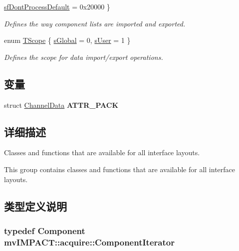 \begin{DoxyCompactItemize}
$$\hyperlink{group___common_interface_gga9390ccf3b2ebe68eee998798d59dc823a05618930605f5d0981bdfe164706004d}{sf\+Dont\+Process\+Default} = 0x20000
 \}
\begin{DoxyCompactList}\small\item\em Defines the way component lists are imported and exported. \end{DoxyCompactList}\item 
enum \hyperlink{group___common_interface_gae6cc8fec0123f239690564ecdeba4350}{T\+Scope} \{ \hyperlink{group___common_interface_ggae6cc8fec0123f239690564ecdeba4350a54b8661877c9fef76d20cc2b83722c60}{s\+Global} = 0, 
\hyperlink{group___common_interface_ggae6cc8fec0123f239690564ecdeba4350a333304553cd48305e063dcda379bde79}{s\+User} = 1
 \}
\begin{DoxyCompactList}\small\item\em Defines the scope for data import/export operations. \end{DoxyCompactList}\end{DoxyCompactItemize}
\subsection*{变量}
\begin{DoxyCompactItemize}
\item 
\hypertarget{group___common_interface_ga715e860bc776ff3bd3c5608d3b2b7673}{struct \hyperlink{struct_channel_data}{Channel\+Data} {\bfseries A\+T\+T\+R\+\_\+\+P\+A\+C\+K}}\label{group___common_interface_ga715e860bc776ff3bd3c5608d3b2b7673}

\end{DoxyCompactItemize}


\subsection{详细描述}
Classes and functions that are available for all interface layouts. 

This group contains classes and functions that are available for all interface layouts. 

\subsection{类型定义说明}
\hypertarget{group___common_interface_ga461a5ba2197d9e599ee35e2514d684ef}{
\subsubsection[{Component\+Iterator}]{\setlength{\rightskip}{0pt plus 5cm}typedef {\bf Component} {\bf mv\+I\+M\+P\+A\+C\+T\+::acquire\+::\+Component\+Iterator}}}\label{group___common_interface_ga461a5ba2197d9e599ee35e2514d684ef}


